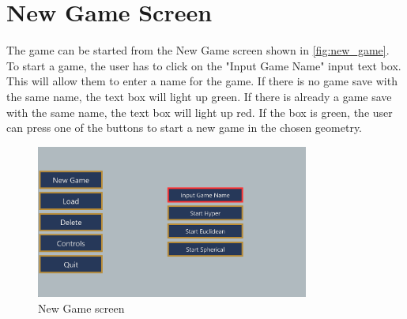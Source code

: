 \section{New Game Screen}
The game can be started from the New Game screen shown in \autoref{fig:new_game}.
To start a game, the user has to click on the "Input Game Name" input text box.
This will allow them to enter a name for the game.
If there is no game save with the same name, the text box will light up green.
If there is already a game save with the same name, the text box will light up red.
If the box is green, the user can press one of the buttons to start a new game in the chosen geometry.

\begin{figure}[h]
    \centering
    \includegraphics[width=0.8\textwidth]{chapters/user_manual/resources/new-game-no-input.png}
    \caption{New Game screen}
    \label{fig:new_game}
\end{figure}